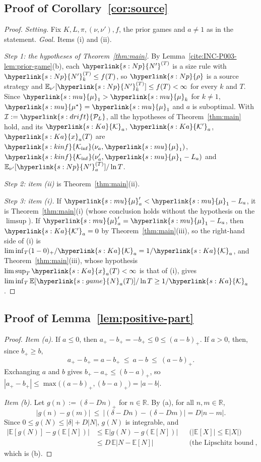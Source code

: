 \documentclass[11pt]{article}
\newcommand{\sy}[2]{\hyperlink{#1}{#2}}
\newcommand{\E}{\mathbb{E}}
\newcommand{\R}{\mathbb{R}}
\newcommand{\Kinf}{\sy{s:kinf}{\mathcal{K}_{\inf}}}
\newcommand{\mean}{\sy{s:mu}{\mu}}
\newcommand{\ms}{\sy{s:mu}{\mu^{\star}}}
\newcommand{\Np}{\sy{s:Np}{N'}}
\newcommand{\rhos}{\sy{s:Np}{\rho}}
\newcommand{\Nc}{\sy{s:game}{N}}
\newcommand{\PcL}{\sy{s:drift}{\mathcal{P}_{L}}}
\newcommand{\Ka}{\sy{s:Ka}{\mathcal{K}}}
\newcommand{\Kp}{\sy{s:Ka}{\mathcal{K}'}}
\newcommand{\xr}{\sy{s:Ka}{x}}
\begin{document}
\subsection{Proof of Corollary~\ref{cor:source}}\label{sec:proof-cor}

\begin{proof}
\emph{Setting.} Fix $K,L,\pi,(\nu,\nu'),f$, the prior games and $a\ne1$ as in the statement.
\emph{Goal.} Items (i) and (ii).

\emph{Step 1: the hypotheses of Theorem~\ref{thm:main}.} By
Lemma~\ref{cite:INC-P003-lem:prior-game}(b), each $\Np^{(T)}$ is a size rule with
$\Np^{(T)}_k\le f(T)$, so $\rhos$ is a source strategy and $\E_{\nu'}[\Np^{(T)}_k]\le f(T)<\infty$
for every $k$ and $T$. Since $\mean_1>\mean_k$ for $k\ne1$, $\ms=\mean_1$ and $a$ is suboptimal. With
$\mathcal I:=\PcL$, all the hypotheses of Theorem~\ref{thm:main} hold, and its $\Ka_a$, $\Kp_a$,
$\xr_a(T)$ are $\Kinf(\nu_a,\mean_1)$, $\Kinf(\nu'_a,\mean_1-L_a)$ and
$\E_{\nu'}[\Np^{(T)}_a]/\ln T$.

\emph{Step 2: item (ii)} is Theorem~\ref{thm:main}(ii).

\emph{Step 3: item (i).} If $\mean'_a<\mean_1-L_a$, it is Theorem~\ref{thm:main}(i) (whose
conclusion holds without the hypothesis on the $\limsup$). If $\mean'_a=\mean_1-L_a$, then $\Kp_a=0$
by Theorem~\ref{thm:main}(iii), so the right-hand side of (i) is
$\liminf_T(1-0)_+/\Ka_a=1/\Ka_a$, and Theorem~\ref{thm:main}(iii), whose hypothesis
$\limsup_T\xr_a(T)<\infty$ is that of (i), gives $\liminf_T\E[\Nc_a(T)]/\ln T\ge1/\Ka_a$.
\end{proof}

\subsection{Proof of Lemma~\ref{lem:positive-part}}\label{sec:proof-positive-part}

\begin{proof}
\uses{}
\emph{Item (a).} If $a\le0$, then $a_+-b_+=-b_+\le0\le(a-b)_+$. If $a>0$, then, since $b_+\ge b$,
\begin{equation*}
a_+-b_+=a-b_+\ \le\ a-b\ \le\ (a-b)_+ .
\end{equation*}
Exchanging $a$ and $b$ gives $b_+-a_+\le(b-a)_+$, so
$|a_+-b_+|\le\max\big((a-b)_+,(b-a)_+\big)=|a-b|$.

\emph{Item (b).} Let $g(n):=(\delta-Dn)_+$ for $n\in\R$. By (a), for all $n,m\in\R$,
\begin{equation*}
|g(n)-g(m)|\ \le\ |(\delta-Dn)-(\delta-Dm)|=D|n-m| .
\end{equation*}
Since $0\le g(N)\le|\delta|+D|N|$, $g(N)$ is integrable, and
\begin{align*}
\big|\E[g(N)]-g(\E[N])\big|&\le\E\big|g(N)-g(\E[N])\big|
&&\text{($|\E[X]|\le\E|X|$)}\\
&\le D\,\E\big|N-\E[N]\big| &&\text{(the Lipschitz bound above)},
\end{align*}
which is (b).
\end{proof}
\end{document}
